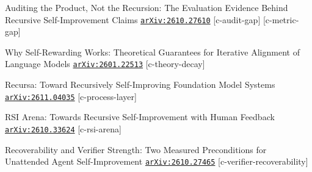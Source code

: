 \begin{refs}
[49] Auditing the Product, Not the Recursion: The Evaluation Evidence Behind Recursive Self-Improvement Claims \href{https://arxiv.org/abs/2610.27610}{\texttt{arXiv:2610.27610}} [c-audit-gap] [c-metric-gap]\par
[50] Why Self-Rewarding Works: Theoretical Guarantees for Iterative Alignment of Language Models \href{https://arxiv.org/abs/2601.22513}{\texttt{arXiv:2601.22513}} [c-theory-decay]\par
[51] Recursa: Toward Recursively Self-Improving Foundation Model Systems \href{https://arxiv.org/abs/2611.04035}{\texttt{arXiv:2611.04035}} [c-process-layer]\par
[52] RSI Arena: Towards Recursive Self-Improvement with Human Feedback \href{https://arxiv.org/abs/2610.33624}{\texttt{arXiv:2610.33624}} [c-rsi-arena]\par
[53] Recoverability and Verifier Strength: Two Measured Preconditions for Unattended Agent Self-Improvement \href{https://arxiv.org/abs/2610.27465}{\texttt{arXiv:2610.27465}} [c-verifier-recoverability]\par
\end{refs}
\endgroup
